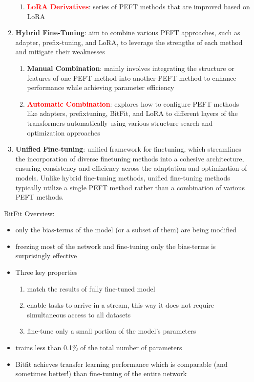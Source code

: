 \begin{enumerate}
\begin{enumerate}
        \item \textbf{\textcolor{red}{LoRA Derivatives}}: series of PEFT methods that are improved based on LoRA
    \end{enumerate}
    \item \textbf{Hybrid Fine-Tuning}: aim to combine various PEFT approaches, such as adapter, prefix-tuning, and LoRA, to leverage the strengths of each method and mitigate their weaknesses
    \begin{enumerate}
        \item \textbf{Manual Combination}: mainly involves integrating the structure or features of one PEFT method into another PEFT method to enhance performance while achieving parameter efficiency
        \item \textbf{\textcolor{red}{Automatic Combination}}: explores how to configure PEFT methods like adapters, prefixtuning, BitFit, and LoRA to different layers of the transformers automatically using various structure search and optimization approaches
    \end{enumerate}
    \item \textbf{Unified Fine-tuning}: unified framework for finetuning, which streamlines the incorporation of diverse finetuning methods into a cohesive architecture, ensuring consistency and efficiency across the adaptation and optimization of models. Unlike hybrid fine-tuning methods, unified fine-tuning methods typically utilize a single PEFT method rather than a combination of various PEFT methods.
\end{enumerate}

\noindent{} \cite{zaken2022bitfit} BitFit Overview:
\begin{itemize}
    \item only the bias-terms of the model (or a subset of them) are being modified
    \item  freezing most of the network and fine-tuning only the bias-terms is surprisingly effective
    \item Three key properties
    \begin{enumerate}
        \item match the results of fully fine-tuned model
        \item enable tasks to arrive in a stream, this way it does not require simultaneous access to all datasets
        \item  fine-tune only a small portion of the model’s parameters
    \end{enumerate}
    \item trains less than 0.1\% of the total number of parameters
    \item Bitfit achieves transfer learning performance which is comparable (and sometimes better!) than fine-tuning of the entire network
\end{itemize}